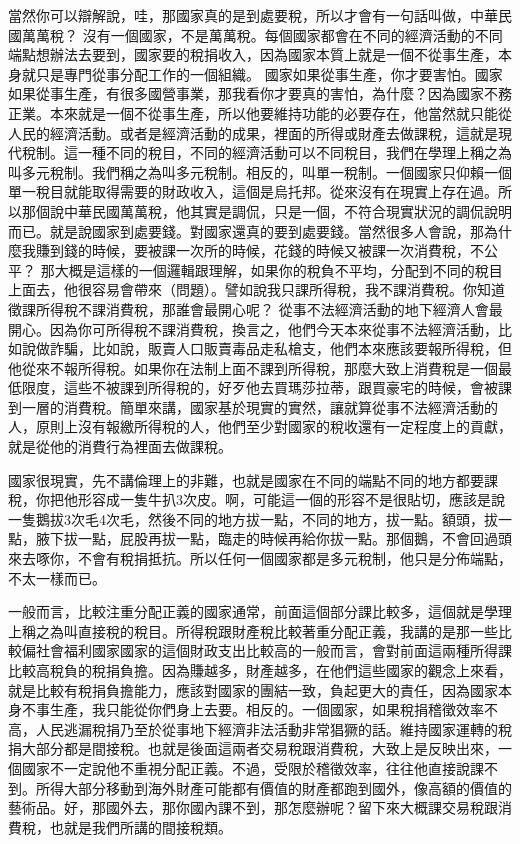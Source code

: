 \documentclass[]{ctexbook}
\begin{document}
當然你可以辯解說，哇，那國家真的是到處要稅，所以才會有一句話叫做，中華民國萬萬稅？ 沒有一個國家，不是萬萬稅。每個國家都會在不同的經濟活動的不同端點想辦法去要到，國家要的稅捐收入，因為國家本質上就是一個不從事生產，本身就只是專門從事分配工作的一個組織。
國家如果從事生產，你才要害怕。國家如果從事生產，有很多國營事業，那我看你才要真的害怕，為什麼？因為國家不務正業。本來就是一個不從事生產，所以他要維持功能的必要存在，他當然就只能從人民的經濟活動。或者是經濟活動的成果，裡面的所得或財產去做課稅，這就是現代稅制。這一種不同的稅目，不同的經濟活動可以不同稅目，我們在學理上稱之為叫多元稅制。我們稱之為叫多元稅制。相反的，叫單一稅制。一個國家只仰賴一個單一稅目就能取得需要的財政收入，這個是烏托邦。從來沒有在現實上存在過。所以那個說中華民國萬萬稅，他其實是調侃，只是一個，不符合現實狀況的調侃說明而已。就是說國家到處要錢。對國家還真的要到處要錢。當然很多人會說，那為什麼我賺到錢的時候，要被課一次所的時候，花錢的時候又被課一次消費稅，不公平？ 那大概是這樣的一個邏輯跟理解，如果你的稅負不平均，分配到不同的稅目上面去，他很容易會帶來（問題）。譬如說我只課所得稅，我不課消費稅。你知道徵課所得稅不課消費稅，那誰會最開心呢？ 從事不法經濟活動的地下經濟人會最開心。因為你可所得稅不課消費稅，換言之，他們今天本來從事不法經濟活動，比如說做詐騙，比如說，販賣人口販賣毒品走私槍支，他們本來應該要報所得稅，但他從來不報所得稅。如果你在法制上面不課到所得稅，那麼大致上消費稅是一個最低限度，這些不被課到所得稅的，好歹他去買瑪莎拉蒂，跟買豪宅的時候，會被課到一層的消費稅。簡單來講，國家基於現實的實然，讓就算從事不法經濟活動的人，原則上沒有報繳所得稅的人，他們至少對國家的稅收還有一定程度上的貢獻，就是從他的消費行為裡面去做課稅。

國家很現實，先不講倫理上的非難，也就是國家在不同的端點不同的地方都要課稅，你把他形容成一隻牛扒3次皮。啊，可能這一個的形容不是很貼切，應該是說一隻鵝拔3次毛4次毛，然後不同的地方拔一點，不同的地方，拔一點。額頭，拔一點，腋下拔一點，屁股再拔一點，臨走的時候再給你拔一點。那個鵝，不會回過頭來去啄你，不會有稅捐抵抗。所以任何一個國家都是多元稅制，他只是分佈端點，不太一樣而已。

一般而言，比較注重分配正義的國家通常，前面這個部分課比較多，這個就是學理上稱之為叫直接稅的稅目。所得稅跟財產稅比較著重分配正義，我講的是那一些比較偏社會福利國家國家的這個財政支出比較高的一般而言，會對前面這兩種所得課比較高稅負的稅捐負擔。因為賺越多，財產越多，在他們這些國家的觀念上來看，就是比較有稅捐負擔能力，應該對國家的團結一致，負起更大的責任，因為國家本身不事生產，我只能從你們身上去要。相反的。一個國家，如果稅捐稽徵效率不高，人民逃漏稅捐乃至於從事地下經濟非法活動非常猖獗的話。維持國家運轉的稅捐大部分都是間接稅。也就是後面這兩者交易稅跟消費稅，大致上是反映出來，一個國家不一定說他不重視分配正義。不過，受限於稽徵效率，往往他直接說課不到。所得大部分移動到海外財產可能都有價值的財產都跑到國外，像高額的價值的藝術品。好，那國外去，那你國內課不到，那怎麼辦呢？留下來大概課交易稅跟消費稅，也就是我們所講的間接稅類。
\end{document}
